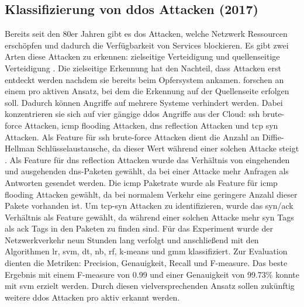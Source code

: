 \documentclass[
    12pt, %
    DIV10,
    ngerman, %
    a4paper, %
    oneside, %
    titlepage, %
    parskip=half, %
    headings=normal, %
    listof=totoc, %
    bibliography=totoc, %
    index=totoc, %
    captions=tableheading, %
    final %
]{scrreprt}
\begin{document}
\subsection{Klassifizierung von \acs{ddos} Attacken (2017)}
Bereits seit den 80er Jahren gibt es \ac{dos} Attacken, welche Netzwerk Ressourcen erschöpfen und dadurch die Verfügbarkeit von Services blockieren. Es gibt zwei Arten diese Attacken zu erkennen: zielseitige Verteidigung und quellenseitige Verteidigung \parencite{He2017}. Die zielseitige Erkennung hat den Nachteil, dass Attacken erst entdeckt werden nachdem sie bereits beim Opfersystem ankamen. \textcite{He2017} forschen an einem pro aktiven Ansatz, bei dem die Erkennung auf der Quellenseite erfolgen soll. Dadurch können Angriffe auf mehrere Systeme verhindert werden. Dabei konzentrieren sie sich auf vier gängige \ac{ddos} Angriffe aus der Cloud: \ac{ssh} brute-force Attacken, \ac{icmp} flooding Attacken, \ac{dns} reflection Attacken und \ac{tcp} \ac{syn} Attacken. Als Feature für \ac{ssh} brute-force Attacken dient die Anzahl an Diffie-Hellman Schlüsselaustausche, da dieser Wert während einer solchen Attacke steigt \parencite{He2017}. Als Feature für \ac{dns} reflection Attacken wurde das Verhältnis von eingehenden und ausgehenden \ac{dns}-Paketen gewählt, da bei einer Attacke mehr Anfragen als Antworten gesendet werden. Die \ac{icmp} Paketrate wurde als Feature für \ac{icmp} flooding Attacken gewählt, da bei normalem Verkehr eine geringere Anzahl dieser Pakete vorhanden ist. Um \ac{tcp}-\ac{syn} Attacken zu identifizieren, wurde das \ac{syn}/\ac{ack} Verhältnis als Feature gewählt, da während einer solchen Attacke mehr \ac{syn} Tags als \ac{ack} Tags in den Paketen zu finden sind. Für das Experiment wurde der Netzwerkverkehr neun Stunden lang verfolgt und anschlie{\ss}end mit den Algorithmen \ac{lr}, \ac{svm}, \ac{dt}, \ac{nb}, \ac{rf}, k-means und \ac{gmm} klassifiziert. Zur Evaluation dienten die Metriken: Precision, Genauigkeit, Recall und F-measure. Das beste Ergebnis mit einem F-measure von 0.99 und einer Genauigkeit von 99.73\% konnte mit \ac{svm} erzielt werden.
Durch diesen vielversprechenden Ansatz sollen zukünftig weitere \ac{ddos} Attacken pro aktiv erkannt werden.
%
\end{document}
